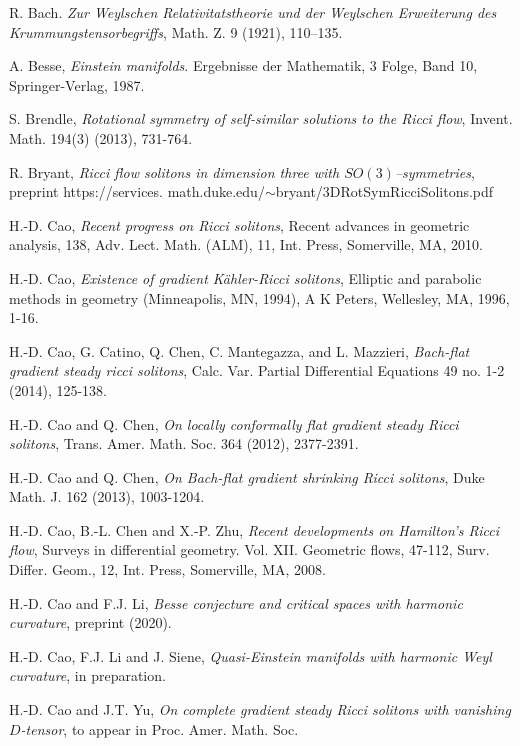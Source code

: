 \documentclass{amsart}
\theoremstyle{definition}
\theoremstyle{remark}
\numberwithin{equation}{section}
\begin{document}
	
	\begin{thebibliography}{30}
		R. Bach. {\em Zur Weylschen Relativi{t\:at}stheorie und der Weylschen Erweiterung des Krummungstensorbegriffs}, Math. Z. 9 (1921), 110--135.
		
		  A. Besse,  {\em Einstein manifolds}. Ergebnisse der Mathematik, 3 Folge, Band 10, Springer-Verlag, 1987.
		
		 S. Brendle, {\em Rotational symmetry of self-similar solutions to the Ricci flow}, Invent. Math. 194(3) (2013), 731-764.

 R. Bryant, {\em Ricci flow solitons in dimension three with $SO(3)$–symmetries}, preprint 
https://services.
math.duke.edu/$\sim$bryant/3DRotSymRicciSolitons.pdf

		 H.-D. Cao, {\em Recent progress on Ricci solitons}, Recent advances in geometric
		analysis, 138, Adv. Lect. Math. (ALM), 11, Int. Press, Somerville, MA, 2010.
		
		 H.-D. Cao, {\em Existence of gradient {K}\"ahler-{R}icci solitons},
		Elliptic and parabolic methods in geometry (Minneapolis, MN, 1994), A K Peters,
		Wellesley, MA, 1996, 1-16.
		
		 H.-D. Cao, G. Catino, Q. Chen, C. Mantegazza,
		and L. Mazzieri,  {\em Bach-flat gradient steady ricci solitons}, Calc. Var. Partial Differential Equations 49 no. 1-2 (2014), 125-138.
		
		  H.-D. Cao and Q. Chen, {\em On locally conformally flat gradient steady Ricci solitons},
		Trans. Amer. Math. Soc. 364 (2012), 2377-2391.
		
		 H.-D. Cao and Q. Chen, {\em On Bach-flat gradient shrinking Ricci solitons}, Duke
		Math. J. 162 (2013), 1003-1204.
		
		 H.-D. Cao, B.-L. Chen and X.-P. Zhu, {\em Recent developments on Hamilton's Ricci flow},   Surveys in differential geometry. Vol. XII. Geometric flows,  47-112, Surv. Differ. Geom., 12, Int. Press, Somerville, MA, 2008.

          H.-D. Cao and F.J. Li, {\em  Besse conjecture and critical spaces with harmonic curvature}, preprint (2020).

 H.-D. Cao, F.J. Li and J. Siene, {\em  Quasi-Einstein manifolds with harmonic Weyl curvature}, in preparation. 
		
		 H.-D. Cao and J.T. Yu, {\em On complete gradient steady Ricci solitons with vanishing $D$-tensor},
		to appear in Proc. Amer. Math. Soc. 
		

\end{thebibliography}
\end{document}
